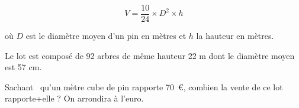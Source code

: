 \begin{enumerate}
\[V = \dfrac{10}{24} \times D^2 \times h\]

où $D$ est le diamètre moyen d'un pin en mètres et $h$ la hauteur en mètres.

Le lot est composé de 92 arbres de même hauteur 22 m dont le diamètre moyen
est 57 cm.

Sachant~ qu'un mètre cube de pin rapporte 70~\euro, combien la vente de ce lot
rapporte+elle ? On arrondira à l'euro.
\end{enumerate}

\vspace{0,5cm}

